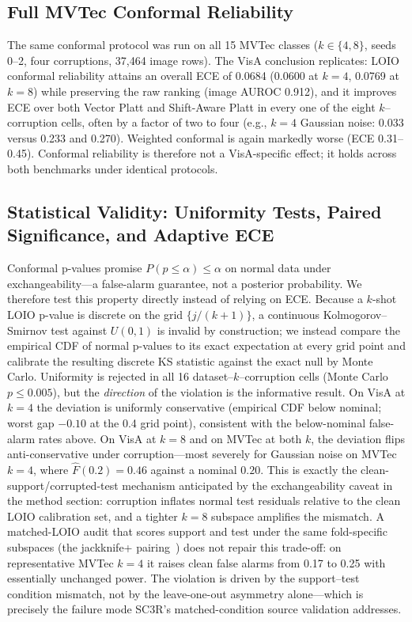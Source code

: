\subsection{Full MVTec Conformal Reliability}
The same conformal protocol was run on all 15 MVTec classes ($k\in\{4,8\}$, seeds 0--2, four corruptions, 37{,}464 image rows). The VisA conclusion replicates: LOIO conformal reliability attains an overall ECE of 0.0684 (0.0600 at $k{=}4$, 0.0769 at $k{=}8$) while preserving the raw ranking (image AUROC 0.912), and it improves ECE over both Vector Platt and Shift-Aware Platt in every one of the eight $k$--corruption cells, often by a factor of two to four (e.g., $k{=}4$ Gaussian noise: 0.033 versus 0.233 and 0.270). Weighted conformal is again markedly worse (ECE 0.31--0.45). Conformal reliability is therefore not a VisA-specific effect; it holds across both benchmarks under identical protocols.

\subsection{Statistical Validity: Uniformity Tests, Paired Significance, and Adaptive ECE}
\label{sec:uniformity}
Conformal p-values promise $P(p\le\alpha)\le\alpha$ on normal data under exchangeability---a false-alarm guarantee, not a posterior probability. We therefore test this property directly instead of relying on ECE. Because a $k$-shot LOIO p-value is discrete on the grid $\{j/(k{+}1)\}$, a continuous Kolmogorov--Smirnov test against $U(0,1)$ is invalid by construction; we instead compare the empirical CDF of normal p-values to its exact expectation at every grid point and calibrate the resulting discrete KS statistic against the exact null by Monte Carlo. Uniformity is rejected in all 16 dataset--$k$--corruption cells (Monte Carlo $p\le0.005$), but the \emph{direction} of the violation is the informative result. On VisA at $k{=}4$ the deviation is uniformly conservative (empirical CDF below nominal; worst gap $-0.10$ at the 0.4 grid point), consistent with the below-nominal false-alarm rates above. On VisA at $k{=}8$ and on MVTec at both $k$, the deviation flips anti-conservative under corruption---most severely for Gaussian noise on MVTec $k{=}4$, where $\hat{F}(0.2)=0.46$ against a nominal $0.20$. This is exactly the clean-support/corrupted-test mechanism anticipated by the exchangeability caveat in the method section: corruption inflates normal test residuals relative to the clean LOIO calibration set, and a tighter $k{=}8$ subspace amplifies the mismatch. A matched-LOIO audit that scores support and test under the same fold-specific subspaces (the jackknife+ pairing~\cite{barber2021jackknife}) does not repair this trade-off: on representative MVTec $k{=}4$ it raises clean false alarms from 0.17 to 0.25 with essentially unchanged power. The violation is driven by the support--test condition mismatch, not by the leave-one-out asymmetry alone---which is precisely the failure mode SC3R's matched-condition source validation addresses.

